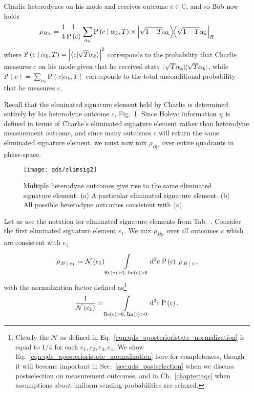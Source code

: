 \noindent Charlie heterodynes on his mode and receives outcome $c \in \mathbb{C}$, and so Bob now holds
\begin{equation}
\rho_{B | c} = \frac{1}{4}\frac{1}{\text{P}\left(c\right)}\sum_{\alpha_k} \text{P}\left(c \given \alpha_k, T\right) \times \dyad{\sqrt{1-T}\alpha_k}_B
\end{equation}
where $\text{P}\left(c \; \middle| \; \alpha_k, T\right) = \left| \langle c | \sqrt{T}\alpha_k\rangle \right|^2$ corresponds to the probability that Charlie measures $c$ on his mode given that he received state $\dyad*{\sqrt{T}\alpha_k}$, while $\text{P}\left(c\right) = \sum_{\alpha_k} \text{P}\left(c | \alpha_k, T\right)$ corresponds to the total unconditional probability that he measures $c$.

Recall that the eliminated signature element held by Charlie is determined entirely by his heterodyne outcome $c$, Fig.~\ref{fig:qds_elimsig2}. Since Holevo information $\chi$ is defined in terms of Charlie's eliminated signature element rather than heterodyne measurement outcome, and since many outcomes $c$ will return the same eliminated signature element, we must now mix $\rho_{B | c}$ over entire quadrants in phase-space.

\begin{figure}[htp]
\centering
\texttt{[image: qds/elimsig2]}
\caption{\label{fig:qds_elimsig2} Multiple heterodyne outcomes give rise to the same eliminated signature element. (a) A particular eliminated signature element. (b) All possible heterodyne outcomes consistent with (a).}
\end{figure}


Let us use the notation for eliminated signature elements from Tab.~. Consider the first eliminated signature element $e_1$. We mix $\rho_{B | c}$ over all outcomes $c$ which are consistent with $e_1$

\begin{equation}\label{eqn:qds_aposterioristate}
\rho_{\left. B \; \middle| \; e_1\right.} = \mathcal{N}\left(e_1\right) \int\limits_{\text{Re}\left(c\right) > 0, \; \text{Im}\left(c\right)>0} \mathop{}\!\mathrm{d^2} c \; \text{P}\left(c\right) \; \rho_{\left. B \; \middle| \;  c\right.},
\end{equation}
with the normalization factor defined as\footnote{Clearly the $\mathcal{N}$ as defined in Eq.~\ref{eqn:qds_aposterioristate_normalization} is equal to $1/4$ for each $e_1, e_2, e_3, e_4$. We show Eq.~\ref{eqn:qds_aposterioristate_normalization} here for completeness, though it will become important in Sec.~\ref{sec:qds_postselection} when we discuss postselection on measurement outcomes, and in Ch.~\ref{chapter:aqc} when assumptions about uniform sending probabilities are relaxed.}
\begin{equation}\label{eqn:qds_aposterioristate_normalization}
\frac{1}{\mathcal{N}\left(e_1\right)} = \int\limits_{\text{Re}\left(c\right) > 0, \; \text{Im}\left(c\right)>0} \mathop{}\!\mathrm{d^2} c \; \text{P}\left(c\right).
\end{equation}

